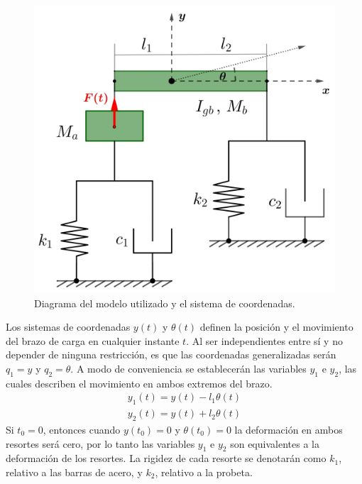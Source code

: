\begin{figure}[h]
\centering
\includegraphics[scale=0.13]{Imagenes/mach_diagram.jpg}
\caption{Diagrama del modelo utilizado y el sistema de coordenadas.}
\label{fig:diag_modelo}
\end{figure}

Los sistemas de coordenadas $y(t)$ y $\theta (t)$ definen la posición y el movimiento del brazo de carga en cualquier instante $t$. Al ser independientes entre sí y no depender de ninguna restricción, es que las coordenadas generalizadas serán $q_1 = y$ y $q_2 = \theta$. A modo de conveniencia se establecerán las variables $y_1$ e $y_2$, las cuales describen el movimiento en ambos extremos del brazo.
\begin{gather}
	y_1(t) = y(t) - l_1\theta(t) \label{eq:y1}\\
	y_2(t) = y(t) + l_2\theta(t) \label{eq:y2}
\end{gather}
Si $t_0=0$, entonces cuando $y(t_0) = 0$ y $\theta(t_0) = 0$ la deformación en ambos resortes será cero, por lo tanto las variables $y_1$ e $y_2$ son equivalentes a la deformación de los resortes. La rigidez de cada resorte se denotarán como $k_1$, relativo a las barras de acero, y $k_2$, relativo a la probeta.

